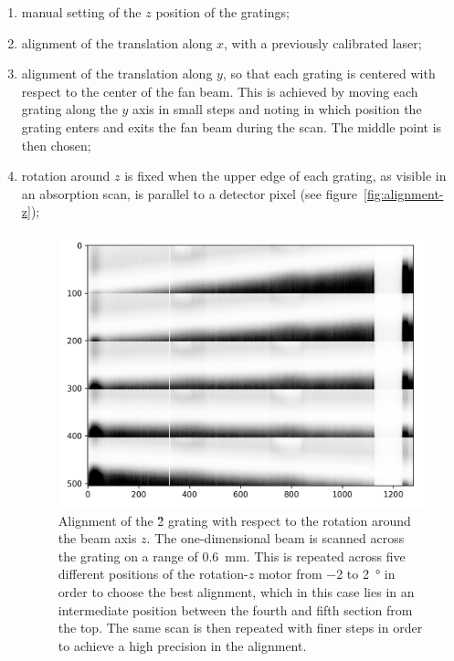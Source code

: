 \begin{enumerate}
    \item manual setting of the $z$ position of the gratings;
    \item alignment of the translation along $x$, with a previously
        calibrated laser;
    \item alignment of the translation along $y$,
        so that each grating is centered with respect to the center of the
        fan beam. This is achieved by moving each grating along the $y$ axis
        in small steps and noting in which position the grating enters and
        exits the fan beam during the scan. The middle point is then
        chosen;
    \item rotation around $z$ is fixed when the upper edge of each grating,
        as visible in an absorption scan, is parallel to a detector
        pixel (see figure~\ref{fig:alignment-z});
        \begin{figure}[htb]
            \centering
            \includegraphics[width=\textwidth]{gfx/alignment-rot-z.png}
            \caption{Alignment of the \G2 grating with respect to the rotation
                around
            the beam axis $z$. The one-dimensional beam is scanned across the
            grating on a range of \SI{0.6}{\milli\metre}. This is repeated across
            five different positions of the rotation-$z$ motor from \num{-2} to
            \SI{+2}{\degree} in order to choose the
            best alignment, which in this case lies in an intermediate position between
            the fourth and fifth section from the top. The same scan is then repeated
        with finer steps in order to achieve a high precision in the alignment.}

\end{figure}
\end{enumerate}
